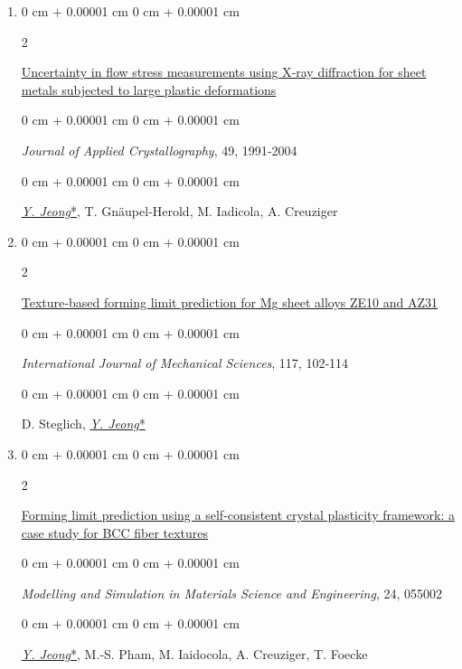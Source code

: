 \documentclass[10pt, letterpaper]{article}
\newenvironment{onecolentry}{
    \begin{adjustwidth}{
        0 cm + 0.00001 cm
    }{
        0 cm + 0.00001 cm
    }
}{
    \end{adjustwidth}
} %
\newenvironment{twocolentry}[2][]{
    \onecolentry
    \def\secondColumn{#2}
    \setcolumnwidth{\fill, 4.5 cm}
    \begin{paracol}{2}
}{
    \switchcolumn \raggedleft \secondColumn
    \end{paracol}
    \endonecolentry
} %
\begin{document}
\begin{enumerate}
        \item
        \begin{twocolentry}{2016}
            \href{https://doi.org/10.1107/S1600576716013662}{Uncertainty in flow stress measurements using X‑ray diffraction for sheet metals subjected to large plastic deformations}
        \end{twocolentry}
        \begin{onecolentry}
            {\it Journal of Applied Crystallography}, 49, 1991‑2004
        \end{onecolentry}
        \begin{onecolentry}
            {\underline{\textit{Y. Jeong}*}}, T. Gnäupel‑Herold, M. Iadicola, A. Creuziger
        \end{onecolentry}
        \vspace{0.10 cm}


        \item
        \begin{twocolentry}{2016}
            \href{http://dx.doi.org/10.1016/j.ijmecsci.2016.08.013}{Texture‑based forming limit prediction for Mg sheet alloys ZE10 and AZ31 }
        \end{twocolentry}
        \begin{onecolentry}
            {\it International Journal of Mechanical Sciences}, 117, 102‑114
        \end{onecolentry}
        \begin{onecolentry}
            D. Steglich, {\underline{\textit{Y. Jeong}*}}
        \end{onecolentry}
        \vspace{0.10 cm}


        \item
        \begin{twocolentry}{2016}
            \href{http://dx.doi.org/10.1088/0965-0393/24/5/055005}{Forming limit prediction using a self‑consistent crystal plasticity framework: a case study for BCC fiber textures}
        \end{twocolentry}
        \begin{onecolentry}
            {\it Modelling and Simulation in Materials Science and Engineering}, 24, 055002
        \end{onecolentry}
        \begin{onecolentry}
            {\underline{\textit{Y. Jeong}*}}, M.‑S. Pham, M. Iaidocola, A. Creuziger, T. Foecke
        \end{onecolentry}
        \vspace{0.10 cm}


\end{enumerate}
\end{document}
